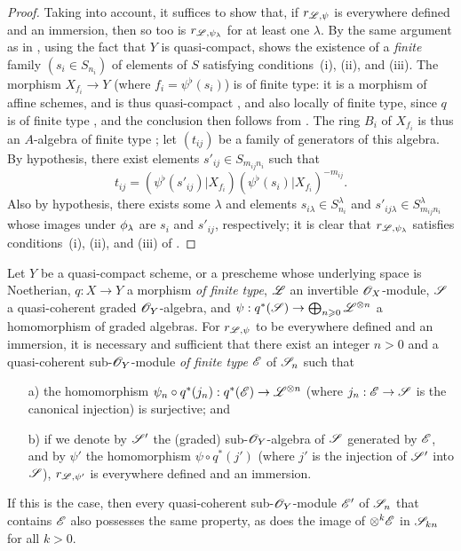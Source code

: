 \begin{proof}
Taking  into account, it suffices to show that, if $r_{\mathscr{L},\psi}$ is everywhere defined and an immersion, then so too is $r_{\mathscr{L},\psi_\lambda}$ for at least one $\lambda$.
By the same argument as in , using the fact that $Y$ is quasi-compact,  shows the existence of a \emph{finite} family $(s_i\in S_{n_i})$ of elements of $S$ satisfying conditions~(i), (ii), and (iii).
The morphism $X_{f_i}\to Y$ (where $f_i=\psi^\flat(s_i)$) is of finite type: it is a morphism of affine schemes, and is thus quasi-compact , and also locally of finite type, since $q$ is of finite type , and the conclusion then follows from .
The ring $B_i$ of $X_{f_i}$ is thus an $A$-algebra of finite type ;
let $(t_{ij})$ be a family of generators of this algebra.
By hypothesis, there exist elements $s'_{ij}\in S_{m_{ij}n_i}$ such that
\[
  t_{ij} = (\psi^\flat(s'_{ij})|X_{f_i})(\psi^\flat(s_i)|X_{f_i})^{-m_{ij}}.
\]
Also by hypothesis, there exists some $\lambda$ and elements $s_{i\lambda}\in S_{n_i}^\lambda$ and $s'_{ij\lambda}\in S_{m_{ij}n_i}^\lambda$ whose images under $\phi_\lambda$ are $s_i$ and $s'_{ij}$, respectively;
it is clear that $r_{\mathscr{L},\psi_\lambda}$ satisfies conditions~(i), (ii), and (iii) of .
\end{proof}

\begin{proposition}[3.8.5]
\label{II.3.8.5}
Let $Y$ be a quasi-compact scheme, or a prescheme whose underlying space is Noetherian, $q:X\to Y$ a morphism \emph{of finite type}, $\mathscr{L}$ an invertible $\mathscr{O}_X$-module, $\mathscr{S}$ a quasi-coherent graded $\mathscr{O}_Y$-algebra, and $\psi:q^*(\sh{S})\to\bigoplus_{n\geq0}\sh{L}^{\otimes n}$ a homomorphism of graded algebras.
For $r_{\mathscr{L},\psi}$ to be everywhere defined and an immersion, it is necessary and sufficient that there exist an integer $n>0$ and a quasi-coherent sub-$\mathscr{O}_Y$-module \emph{of finite type} $\mathscr{E}$ of $\mathscr{S}_n$ such that
\begin{enumerate}
  \item[a)] the homomorphism $\psi_n\circ q^*(j_n):q^*(\sh{E})\to\sh{L}^{\otimes n}$ (where $j_n:\sh{E}\to\sh{S}$ is the canonical injection) is surjective; and
  \item[b)] if we denote by $\mathscr{S}'$ the (graded) sub-$\mathscr{O}_Y$-algebra of $\mathscr{S}$ generated by $\mathscr{E}$, and by $\psi'$ the homomorphism $\psi\circ q^*(j')$ (where $j'$ is the injection of $\mathscr{S}'$ into $\mathscr{S}$), $r_{\mathscr{L},\psi'}$ is everywhere defined and an immersion.
\end{enumerate}

If this is the case, then every quasi-coherent sub-$\mathscr{O}_Y$-module $\mathscr{E}'$ of $\mathscr{S}_n$ that contains $\mathscr{E}$ also possesses the same property, as does the image of $\otimes^k\mathscr{E}$ in $\mathscr{S}_{kn}$ for all $k>0$.
\end{proposition}


